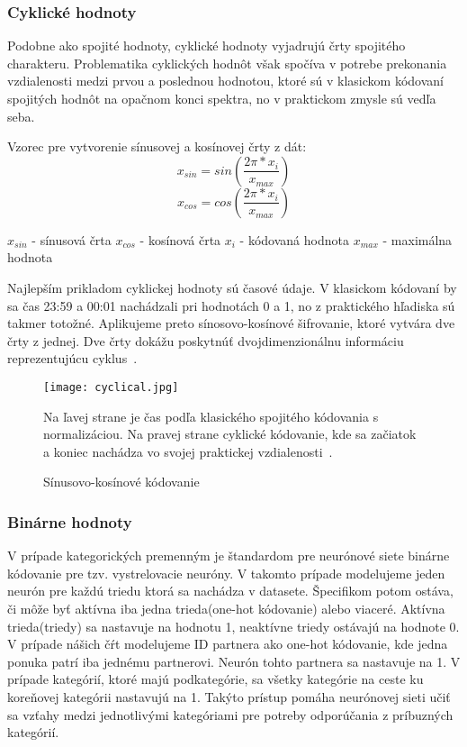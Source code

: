 \subsubsection*{Cyklické hodnoty}

Podobne ako spojité hodnoty, cyklické hodnoty vyjadrujú črty spojitého charakteru. Problematika cyklických hodnôt však spočíva v potrebe prekonania vzdialenosti medzi prvou a poslednou hodnotou, ktoré sú v klasickom kódovaní spojitých hodnôt na opačnom konci spektra, no v praktickom zmysle sú vedľa seba.\newline 


Vzorec pre vytvorenie sínusovej a kosínovej črty z dát:
$$x_{sin}=sin(\frac{2\pi*x_i}{x_{max}})$$
$$x_{cos}=cos(\frac{2\pi*x_i}{x_{max}})$$

\textbf{$x_{sin}$} - sínusová črta\newline
\textbf{$x_{cos}$} - kosínová črta\newline
\textbf{$x_i$}     - kódovaná hodnota\newline
\textbf{$x_{max}$} - maximálna hodnota\newline



Najlepším prikladom cyklickej hodnoty sú časové údaje. V klasickom kódovaní by sa čas 23:59 a 00:01 nachádzali pri hodnotách 0 a 1, no z praktického hľadiska sú takmer totožné. Aplikujeme preto sínosovo-kosínové šifrovanie, ktoré vytvára dve črty z jednej. Dve črty dokážu poskytnúť dvojdimenzionálnu informáciu reprezentujúcu cyklus~\cite{sincosencoding}.

\begin{figure}[H]
\begin{center}
\texttt{[image: cyclical.jpg]}\end{center}
\caption[outliers]{Sínusovo-kosínové kódovanie}
\label{fig:cyclical}
\medskip
\small
Na ľavej strane je čas podľa klasického spojitého kódovania s normalizáciou. Na pravej strane cyklické kódovanie, kde sa začiatok a koniec nachádza vo svojej praktickej vzdialenosti~\cite{sincosencoding}.
\end{figure} 

\subsubsection*{Binárne hodnoty}

V prípade kategorických premenným je štandardom pre neurónové siete binárne kódovanie pre tzv. vystrelovacie neuróny. V takomto prípade modelujeme jeden neurón pre každú triedu ktorá sa nachádza v datasete. Špecifikom potom ostáva, či môže byť aktívna iba jedna trieda(one-hot kódovanie) alebo viaceré. Aktívna trieda(triedy) sa nastavuje na hodnotu 1, neaktívne triedy ostávajú na hodnote 0. \newline
V prípade nášich čŕt modelujeme ID partnera ako one-hot kódovanie, kde jedna ponuka patrí iba jednému partnerovi. Neurón tohto partnera sa nastavuje na 1. V prípade kategórií, ktoré majú podkategórie, sa všetky kategórie na ceste ku koreňovej kategórii nastavujú na 1. Takýto prístup pomáha neurónovej sieti učiť sa vzťahy medzi jednotlivými kategóriami pre potreby odporúčania z príbuzných kategórií. 

